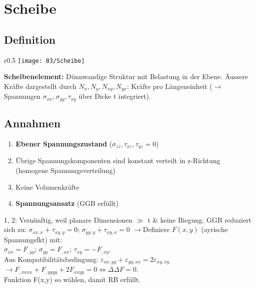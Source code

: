 \section{Scheibe}
    \subsection{Definition}
        \begin{wrapfigure}[7]{r}{0.5\linewidth}
            \vspace{-5mm}
            \texttt{[image: 03/Scheibe]}
        \end{wrapfigure}
        \textbf{Scheibenelement:} Dünnwandige Struktur mit Belastung in der Ebene. Äussere Kräfte dargestellt durch $N_x,N_y,N_{xy},N_{yx}$: Kräfte pro Längeneinheit ($\rightarrow$ Spannungen $\sigma_{xx},\sigma_{yy},\tau_{xy}$ über Dicke t integriert).
    
    \subsection{Annahmen}
        \begin{enumerate}[noitemsep]
            \item \textbf{Ebener Spannungszustand} ($\sigma_{zz},\tau_{xz},\tau_{yz}=0$)
            \item Übrige Spannungskomponenten sind konstant verteilt in z-Richtung (homogene Spannungsverteilung)
            \item Keine Volumenkräfte
            \item \textbf{Spannungsansatz} (GGB erfüllt)
        \end{enumerate}
        1, 2: Vernünftig, weil planare Dimensionen $\gg$ t \& keine Biegung. GGB reduziert sich zu: $\displaystyle\sigma_{xx,x} + \tau_{xy,y}=0$; $\sigma_{yy,y} + \tau_{xy,x}=0$
        $\rightarrow$Definiere $F(x,y)$ (ayrische Spannungsfkt) mit:\\ $\sigma_{xx}=F_{,yy}$; $\sigma_{yy}=F_{,xx}$; $\tau_{xy}=-F_{,xy}$. 
        \\Aus Kompatibilitätsbedingung: $\varepsilon_{xx,yy}+\varepsilon_{yy,xx}=2\varepsilon_{xy,xy}$ \\$\rightarrow F_{,xxxx}+F_{,yyyy}+2F_{xxyy}=0 \Leftrightarrow\Delta\Delta F=0$.
        \\Funktion F(x,y) so wählen, damit RB erfüllt.
\columnbreak    
